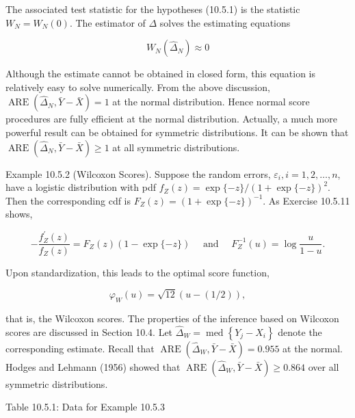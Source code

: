 The associated test statistic for the hypotheses (10.5.1) is the statistic $W_{N}=W_{N}(0)$. The estimator of $\Delta$ solves the estimating equations


\begin{equation*}
W_{N}\left(\widehat{\Delta}_{N}\right) \approx 0 \tag{10.5.31}
\end{equation*}


Although the estimate cannot be obtained in closed form, this equation is relatively easy to solve numerically. From the above discussion, $\operatorname{ARE}\left(\widehat{\Delta}_{N}, \bar{Y}-\bar{X}\right)=1$ at the normal distribution. Hence normal score procedures are fully efficient at the normal distribution. Actually, a much more powerful result can be obtained for symmetric distributions. It can be shown that $\operatorname{ARE}\left(\widehat{\Delta}_{N}, \bar{Y}-\bar{X}\right) \geq 1$ at all symmetric distributions.

Example 10.5.2 (Wilcoxon Scores). Suppose the random errors, $\varepsilon_{i}, i=1,2, \ldots, n$, have a logistic distribution with pdf $f_{Z}(z)=\exp \{-z\} /(1+\exp \{-z\})^{2}$. Then the corresponding cdf is $F_{Z}(z)=(1+\exp \{-z\})^{-1}$. As Exercise 10.5.11 shows,


\begin{equation*}
-\frac{f_{Z}^{\prime}(z)}{f_{Z}(z)}=F_{Z}(z)(1-\exp \{-z\}) \quad \text { and } \quad F_{Z}^{-1}(u)=\log \frac{u}{1-u} . \tag{10.5.32}
\end{equation*}


Upon standardization, this leads to the optimal score function,


\begin{equation*}
\varphi_{W}(u)=\sqrt{12}(u-(1 / 2)), \tag{10.5.33}
\end{equation*}


that is, the Wilcoxon scores. The properties of the inference based on Wilcoxon scores are discussed in Section 10.4. Let $\widehat{\Delta}_{W}=\operatorname{med}\left\{Y_{j}-X_{i}\right\}$ denote the corresponding estimate. Recall that $\operatorname{ARE}\left(\widehat{\Delta}_{W}, \bar{Y}-\bar{X}\right)=0.955$ at the normal. Hodges and Lehmann (1956) showed that $\operatorname{ARE}\left(\widehat{\Delta}_{W}, \bar{Y}-\bar{X}\right) \geq 0.864$ over all symmetric distributions.

Table 10.5.1: Data for Example 10.5.3

